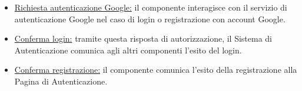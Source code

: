 \documentclass[11pt, a4paper]{article}
\theoremstyle{definition} %
\begin{document}
\begin{description}
\begin{itemize}
        \item \underline{Richiesta autenticazione Google:} il componente
        interagisce con il servizio di autenticazione Google nel caso
        di login o registrazione con account Google.

        \item \underline{Conferma login:} tramite questa risposta di autorizzazione,
        il Sistema di Autenticazione comunica agli altri componenti l'esito
        del login.

        \item \underline{Conferma registrazione:} il componente comunica
        l'esito della registrazione alla Pagina di Autenticazione.
    \end{itemize}
\end{description}
\end{document}
